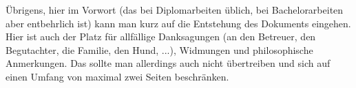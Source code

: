 \noindent
Übrigens, hier im Vorwort (das bei Diplomarbeiten üblich, bei Bachelorarbeiten 
aber entbehrlich ist) kann man kurz auf die Entstehung  des Dokuments eingehen.
Hier ist auch der Platz für allfällige Danksagungen (\zB an den Betreuer, 
den Begutachter, die Familie, den Hund, ...), Widmungen und philosophische 
Anmerkungen. Das sollte man allerdings auch nicht übertreiben und sich auf 
einen Umfang von maximal zwei Seiten beschränken.




